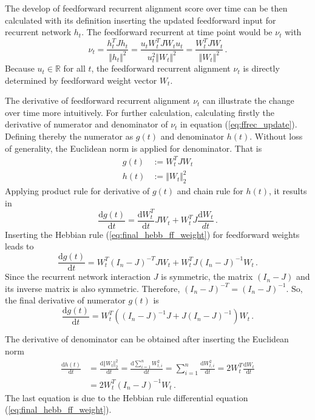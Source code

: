 \documentclass[11pt]{article}
\begin{document}
{	The develop of feedforward recurrent alignment score over time can be then calculated with its definition inserting the updated feedforward input for recurrent network $h_t$. The feedforward recurrent at time point would be $\nu_t$ with
		\begin{equation} \label{eq:ffrec_update}
			\nu_t = \frac{h_t^T J h_t}{\Vert h_t \Vert ^2} = \frac{u_t W_t^T J W_t u_t}{u_t^2 \Vert W_t \Vert ^2} = \frac{W_t^T J W_t}{\Vert W_t \Vert^2}\, . 
		\end{equation}
	Because $u_t \in \mathbb{R}$ for all $t$, the feedforward recurrent alignment $\nu_t$ is directly determined by feedforward weight vector $W_t$.  
	
	The derivative of feedforward recurrent alignment $\nu_t$ can illustrate the change over time more intuitively. For further calculation, calculating firstly the derivative of numerator and denominator of $\nu_t$ in equation (\ref{eq:ffrec_update}). Defining thereby the numerator as $g(t)$ and denominator $h(t)$. Without loss of generality, the Euclidean norm is applied for denominator. That is
		\begin{subequations}
			\begin{align}
				g(t) &:= W_t^T J W_t\\
				h(t) &:= \Vert W_t \Vert_2^2
			\end{align}
		\end{subequations}
	Applying product rule for derivative of $g(t)$ and chain rule for $h(t)$, it results in
		\begin{equation}
				\frac{\mathrm{d}g(t)}{\mathrm{d}t} = \frac{\mathrm{d}W_t^T}{\mathrm{d}t} J W_t + W_t^T J \frac{\mathrm{d}W_t}{dt} \, .
		\end{equation}
	Inserting the Hebbian rule (\ref{eq:final_hebb_ff_weight}) for feedforward weights leads to
		\begin{equation}
			\frac{\mathrm{d}g(t)}{\mathrm{d}t} = W_t^T (I_n - J)^{-T}J W_t + W_t^T J(I_n - J)^{-1} W_t \, .
		\end{equation}
	Since the recurrent network interaction $J$ is symmetric, the matrix $(I_n-J)$ and its inverse matrix is also symmetric. Therefore, $(I_n - J)^{-T} = (I_n - J)^{-1}$. So, the final derivative of numerator $g(t)$ is
		\begin{equation}
			\frac{\mathrm{d}g(t)}{\mathrm{d}t} = W_t^T \left( (I_n - J)^{-1}J + J(I_n - J)^{-1}\right)W_t \, .
		\end{equation}
	
	The derivative of denominator can be obtained after inserting the Euclidean norm 
		\begin{equation}
			\begin{split}
				\frac{\mathrm{d}h(t)}{\mathrm{d}t} & = \frac{\mathrm{d} \Vert W_t \Vert_2^2}{\mathrm{d}t} = \frac{\mathrm{d} \sum_{i=1}^{n} W_{t, i}^2}{\mathrm{d}t}
				= \sum_{i=1}^{n} \frac{\mathrm{d}W_{t,i}^2}{\mathrm{d}t} = 2W_t^T \frac{\mathrm{d}W_t}{\mathrm{d}t} \\
				& = 2W_t^T (I_n - J)^{-1} W_t \,.
			\end{split}
		\end{equation}
	The last equation is due to the Hebbian rule differential equation (\ref{eq:final_hebb_ff_weight}). 
	
}
\end{document}
